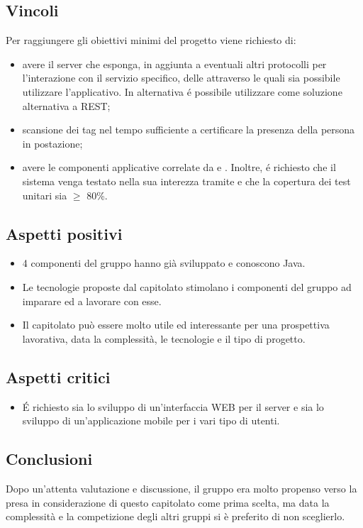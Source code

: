 \subsection{Vincoli}
Per raggiungere gli obiettivi minimi del progetto viene richiesto di:
\begin{itemize}
\item avere il server che esponga, in aggiunta a eventuali altri protocolli per l’interazione con il servizio specifico, delle   attraverso le quali sia possibile utilizzare l'applicativo. In alternativa \'e possibile utilizzare  come soluzione alternativa a REST;
\item scansione dei tag nel tempo sufficiente a certificare la presenza della persona in postazione;
\item avere le componenti applicative correlate da  e . Inoltre, \'e richiesto che il sistema venga testato nella sua interezza tramite  e che la copertura dei test unitari sia $\geq$ 80\%.
\end{itemize}

\subsection{Aspetti positivi}
\begin{itemize} 
	\item 4 componenti del gruppo hanno già sviluppato e conoscono Java.
	\item Le tecnologie proposte dal capitolato stimolano i componenti del gruppo ad imparare ed a lavorare con esse.
	\item Il capitolato può essere molto utile ed interessante per una prospettiva lavorativa, data la complessità, le tecnologie e il tipo di progetto.
\end{itemize}

\subsection{Aspetti critici}
\begin{itemize}
\item \'E richiesto sia lo sviluppo di un'interfaccia WEB per il server e sia lo sviluppo di un'applicazione mobile per i vari tipo di utenti.
\end{itemize}

\subsection{Conclusioni}
Dopo un'attenta valutazione e discussione, il gruppo era molto propenso verso la presa in considerazione di questo capitolato come prima scelta, ma data la complessità e la competizione degli altri gruppi si è preferito di non sceglierlo.
